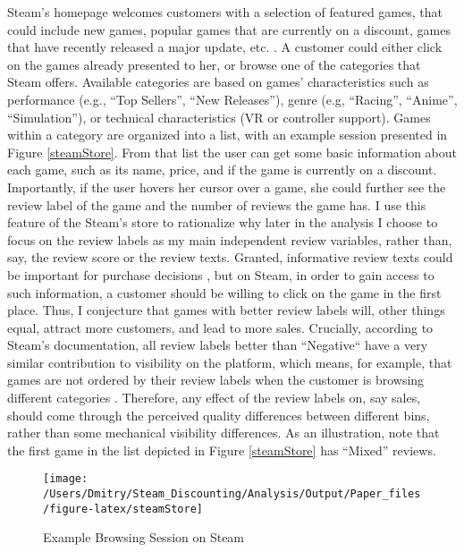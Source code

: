 \documentclass[12pt,pagebackref]{article}
\begin{document}
Steam's homepage welcomes customers with a selection of featured games,
that could include new games, popular games that are currently on a
discount, games that have recently released a major update, etc.
\citep{steamVisibility}. A customer could either click on the games
already presented to her, or browse one of the categories that Steam
offers. Available categories are based on games' characteristics such as
performance (e.g., ``Top Sellers'', ``New Releases''), genre (e.g,
``Racing'', ``Anime'', ``Simulation''), or technical characteristics (VR
or controller support). Games within a category are organized into a
list, with an example session presented in Figure \ref{steamStore}. From
that list the user can get some basic information about each game, such
as its name, price, and if the game is currently on a discount.
Importantly, if the user hovers her cursor over a game, she could
further see the review label of the game and the number of reviews the
game has. I use this feature of the Steam's store to rationalize why
later in the analysis I choose to focus on the review labels as my main
independent review variables, rather than, say, the review score or the
review texts. Granted, informative review texts could be important for
purchase decisions \citep{ChevalierMayzlin06}, but on Steam, in order to
gain access to such information, a customer should be willing to click
on the game in the first place. Thus, I conjecture that games with
better review labels will, other things equal, attract more customers,
and lead to more sales. Crucially, according to Steam's documentation,
all review labels better than ``Negative`` have a very similar
contribution to visibility on the platform, which means, for example,
that games are not ordered by their review labels when the customer is
browsing different categories \citeyearpar{steamVisibility2}. Therefore,
any effect of the review labels on, say sales, should come through the
perceived quality differences between different bins, rather than some
mechanical visibility differences. As an illustration, note that the
first game in the list depicted in Figure \ref{steamStore} has ``Mixed''
reviews.

\begin{figure}[h]
 
 {\centering \texttt{[image: /Users/Dmitry/Steam\_Discounting/Analysis/Output/Paper\_files/figure-latex/steamStore]} 
 
 }
 
 \caption{\label{steamStore}Example Browsing Session on Steam}\label{fig:unnamed-chunk-5}
 \end{figure}
\end{document}
